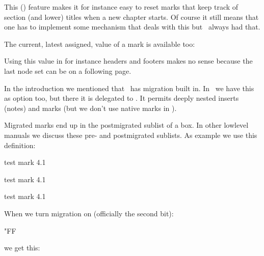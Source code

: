 This (\LUAMETATEX) feature makes it for instance easy to reset marks that keep
track of section (and lower) titles when a new chapter starts. Of course it still
means that one has to implement some mechanism that deals with this but \CONTEXT\
always had that.

The current, latest assigned, value of a mark is available too:

\starttyping[option=TEX]
\stoptyping

Using this value in for instance headers and footers makes no sense because the
last node set can be on a following page.

\stopsectionlevel

\startsectionlevel[title=Migration]

In the introduction we mentioned that \LUAMETATEX\ has migration built in. In
\MKIV\ we have this as option too, but there it is delegated to \LUA. It permits
deeply nested inserts (notes) and marks (but we don't use native marks in \MKIV).

Migrated marks end up in the postmigrated sublist of a box. In other lowlevel
manuals we discuss these pre- and postmigrated sublists. As example we use this
definition:

\startbuffer
{}\vbox\bgroup
test  {mark 4.1}\par
test  {mark 4.1}\par
test \marks 4 {mark 4.1}\par
\egroup
\stopbuffer

\typebuffer[option=TEX]


When we turn migration on (officially the second bit):

\starttyping[option=TEX]
\automigrationmode"FF 
\stoptyping

we get this:

